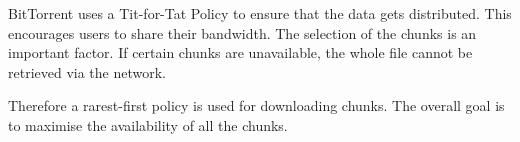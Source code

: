 BitTorrent uses a Tit-for-Tat Policy to ensure that the data gets distributed.
This encourages users to share their bandwidth.
The selection of the chunks is an important factor.
If certain chunks are unavailable,
the whole file cannot be retrieved via the network.

Therefore a rarest-first policy is used for downloading chunks.
The overall goal is to maximise the availability of all the chunks.




